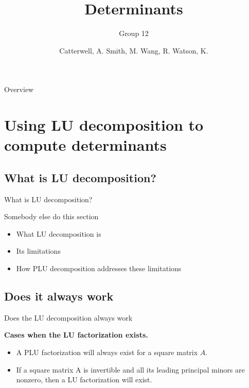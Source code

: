 \documentclass{beamer}
\title{Determinants}
\subtitle{Group 12}
\author{Catterwell, A. \quad Smith, M. \quad Wang, R. \quad Watson, K.}
\institute{University of Edinburgh}
\begin{document}
\begin{frame}
    \maketitle
\end{frame}

\begin{frame}{Overview}
    \tableofcontents
\end{frame}

\section{Using LU decomposition to compute determinants}

\subsection{What is LU decomposition?}

\begin{frame}{What is LU decomposition?}

    Somebody else do this section

    \begin{itemize}
        \item What LU decomposition is
        \item Its limitations
        \item How PLU decomposition addresses these limitations
    \end{itemize}

 \end{frame}

\subsection{Does it always work}

\begin{frame}{Does the LU decomposition always work}

    \textbf{Cases when the LU factorization exists.}

    \begin{itemize}
        \item A PLU factorization will always exist for a square matrix $A$.
        \item If a square matrix A is invertible and all its leading principal minors are nonzero,
            then a LU factorization will exist.
    \end{itemize}


\end{frame}
\end{document}

